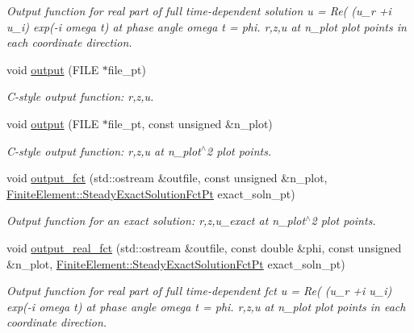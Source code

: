 \begin{DoxyCompactItemize}
\begin{DoxyCompactList}\small\item\em Output function for real part of full time-\/dependent solution u = Re( (u\+\_\+r +i u\+\_\+i) exp(-\/i omega t) at phase angle omega t = phi. r,z,u at n\+\_\+plot plot points in each coordinate direction. \end{DoxyCompactList}\item 
void \hyperlink{classoomph_1_1QFourierDecomposedHelmholtzElement_a36f0992d35d4f19d2d9cf3070b49bba1}{output} (F\+I\+LE $\ast$file\+\_\+pt)
\begin{DoxyCompactList}\small\item\em C-\/style output function\+: r,z,u. \end{DoxyCompactList}\item 
void \hyperlink{classoomph_1_1QFourierDecomposedHelmholtzElement_a846e28bf8f1bae1ace68b0b291688841}{output} (F\+I\+LE $\ast$file\+\_\+pt, const unsigned \&n\+\_\+plot)
\begin{DoxyCompactList}\small\item\em C-\/style output function\+: r,z,u at n\+\_\+plot$^\wedge$2 plot points. \end{DoxyCompactList}\item 
void \hyperlink{classoomph_1_1QFourierDecomposedHelmholtzElement_a4ad5327722a3094908a1141e640a4c1e}{output\+\_\+fct} (std\+::ostream \&outfile, const unsigned \&n\+\_\+plot, \hyperlink{classoomph_1_1FiniteElement_a690fd33af26cc3e84f39bba6d5a85202}{Finite\+Element\+::\+Steady\+Exact\+Solution\+Fct\+Pt} exact\+\_\+soln\+\_\+pt)
\begin{DoxyCompactList}\small\item\em Output function for an exact solution\+: r,z,u\+\_\+exact at n\+\_\+plot$^\wedge$2 plot points. \end{DoxyCompactList}\item 
void \hyperlink{classoomph_1_1QFourierDecomposedHelmholtzElement_a528a56fd0948252c8886e7d559cb134f}{output\+\_\+real\+\_\+fct} (std\+::ostream \&outfile, const double \&phi, const unsigned \&n\+\_\+plot, \hyperlink{classoomph_1_1FiniteElement_a690fd33af26cc3e84f39bba6d5a85202}{Finite\+Element\+::\+Steady\+Exact\+Solution\+Fct\+Pt} exact\+\_\+soln\+\_\+pt)
\begin{DoxyCompactList}\small\item\em Output function for real part of full time-\/dependent fct u = Re( (u\+\_\+r +i u\+\_\+i) exp(-\/i omega t) at phase angle omega t = phi. r,z,u at n\+\_\+plot plot points in each coordinate direction. \end{DoxyCompactList}\item 

\end{DoxyCompactItemize}
